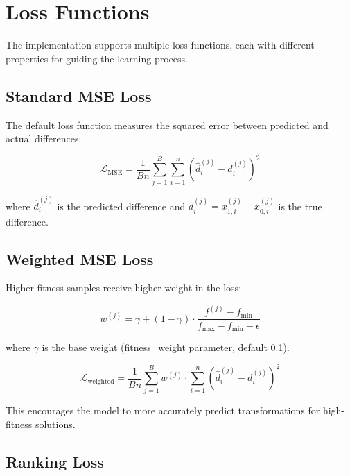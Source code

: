 \documentclass[11pt,a4paper]{article}
\begin{document}
\section{Loss Functions}

The implementation supports multiple loss functions, each with different properties for guiding the learning process.

\subsection{Standard MSE Loss}

The default loss function measures the squared error between predicted and actual differences:

\begin{equation}
    \mathcal{L}_{\text{MSE}} = \frac{1}{Bn}\sum_{j=1}^{B}\sum_{i=1}^{n} \left(\hat{d}_i^{(j)} - d_i^{(j)}\right)^2
\end{equation}

where $\hat{d}_i^{(j)}$ is the predicted difference and $d_i^{(j)} = x_{1,i}^{(j)} - x_{0,i}^{(j)}$ is the true difference.

\subsection{Weighted MSE Loss}

Higher fitness samples receive higher weight in the loss:

\begin{equation}
    w^{(j)} = \gamma + (1 - \gamma) \cdot \frac{f^{(j)} - f_{\min}}{f_{\max} - f_{\min} + \epsilon}
\end{equation}

where $\gamma$ is the base weight (fitness\_weight parameter, default 0.1).

\begin{equation}
    \mathcal{L}_{\text{weighted}} = \frac{1}{Bn}\sum_{j=1}^{B} w^{(j)} \cdot \sum_{i=1}^{n}\left(\hat{d}_i^{(j)} - d_i^{(j)}\right)^2
\end{equation}

This encourages the model to more accurately predict transformations for high-fitness solutions.

\subsection{Ranking Loss}
\end{document}
